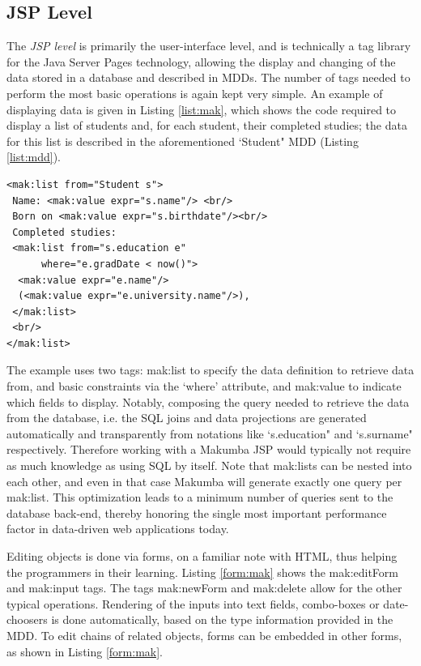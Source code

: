 \documentclass{chi2009}
\begin{document}
\subsection{JSP Level}
The \textit{JSP level} is primarily the user-interface level, and is technically a tag library for the Java Server Pages technology, allowing the display and changing of the data stored in a database and described in MDDs. The number of tags needed to perform the most basic operations is again kept very simple. An example of displaying data is given in Listing \ref{list:mak}, which shows the code required to display a list of students and, for each student, their completed studies; the data for this list is described in the aforementioned `Student" MDD (Listing \ref{list:mdd}).

\lstset{basicstyle=\small, captionpos=b, caption=Example of viewing data with the Makumba JSP tag library, label=list:mak, frame=shadowbox}
\begin{lstlisting}
<mak:list from="Student s">
 Name: <mak:value expr="s.name"/> <br/>
 Born on <mak:value expr="s.birthdate"/><br/>
 Completed studies:
 <mak:list from="s.education e"
      where="e.gradDate < now()">
  <mak:value expr="e.name"/>
  (<mak:value expr="e.university.name"/>),
 </mak:list>
 <br/>
</mak:list>
\end{lstlisting}

The example uses two tags: mak:list to specify the data definition to retrieve data from, and basic constraints via the `where' attribute, and mak:value to indicate which fields to display. Notably, composing the query needed to retrieve the data from the database, i.e. the SQL joins and data projections are generated automatically and transparently from notations like `s.education" and `s.surname" respectively. Therefore working with a Makumba JSP would typically not require as much knowledge as using SQL by itself. Note that mak:lists can be nested into each other, and even in that case Makumba will generate exactly one query per mak:list. This optimization leads to a minimum number of queries sent to the database back-end, thereby honoring the single most important performance factor in data-driven web applications today.

Editing objects is done via forms, on a familiar note with HTML, thus helping the programmers in their learning.  Listing  \ref{form:mak} shows the mak:editForm and mak:input tags. The tags mak:newForm and mak:delete allow for the other typical operations. Rendering of the inputs into text fields, combo-boxes or date-choosers is done automatically, based on the type information provided in the MDD. To edit chains of related objects, forms can be embedded in other forms, as shown in Listing \ref{form:mak}.
\end{document}

